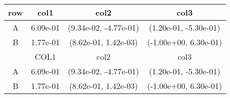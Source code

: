 \begin{tabular}{cccc}
\toprule
row&col1&col2&col3\tabularnewline
\midrule
A&6.09e-01& (9.34e-02, -4.77e-01)& (1.20e-01, -5.30e-01)\tabularnewline
B&1.77e-01& (8.62e-01, 1.42e-03)& (-1.00e+00, 6.30e-01)\tabularnewline
\midrule
&COL1&col2&col3\tabularnewline
\midrule
A&6.09e-01& (9.34e-02, -4.77e-01)& (1.20e-01, -5.30e-01)\tabularnewline
B&1.77e-01& (8.62e-01, 1.42e-03)& (-1.00e+00, 6.30e-01)\tabularnewline
\bottomrule
\end{tabular}
